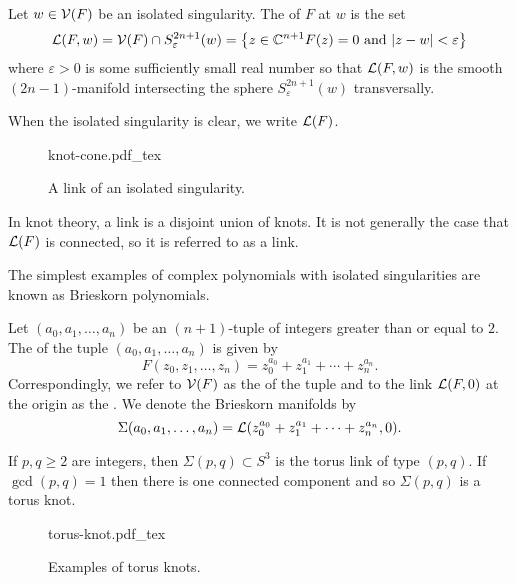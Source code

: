 \begin{definition}
	Let $w\in \mathcal{V}(F)$ be an isolated singularity. The  of $F$ at $w$ is the set 
	\[
		\mathcal{L}(F, w) = \mathcal{V}(F) \cap S^{2n+1}_\varepsilon(w) = \left\{ z\in \mathbb{C}^{n+1}  F(z)=0\textrm{ and } |z-w|<\varepsilon\right\}
	\]
	where $\varepsilon > 0$ is some sufficiently small real number so that $\mathcal{L}(F,w)$ is the smooth $(2n-1)$-manifold intersecting the sphere $S^{2n+1}_\varepsilon(w)$ transversally.
\end{definition}

When the isolated singularity is clear, we write $\mathcal{L}(F)$.

\begin{figure}[ht]
  {knot-cone.pdf_tex}
  \caption{A link of an isolated singularity.}\label{fig:cone-over-knot}
\end{figure}

\begin{remark}
	In knot theory, a link is a disjoint union of knots. It is not generally the case that $\mathcal{L}(F)$ is connected, so it is referred to as a link.
\end{remark}

The simplest examples of complex polynomials with isolated singularities are known as Brieskorn polynomials.

\begin{definition}
	Let $(a_0,a_1,\ldots, a_n)$ be an $(n+1)$-tuple of integers greater than or equal to $2$. The  of the tuple $(a_0,a_1,\ldots, a_n)$ is given by
	\[
		F(z_0,z_1,\ldots, z_n) = z_0^{a_0} + z_1^{a_1} +\cdots + z_n^{a_n}.
	\]
	Correspondingly, we refer to $\mathcal{V}(F)$ as the  of the tuple and to the link $\mathcal{L}(F,0)$ at the origin as the . We denote the Brieskorn manifolds by
	\[
		\Sigma(a_0,a_1,\ldots, a_n) =\mathcal{L}(z_0^{a_0}+z_1^{a_1}+\cdots+z_n^{a_n}, 0).
	\]
\end{definition}

\begin{proposition}
	If $p,q\geq 2$ are integers, then $\Sigma(p,q)\subset S^3$ is the torus link of type $(p,q)$. If $\gcd(p,q)=1$ then there is one connected component and so $\Sigma(p,q)$ is a torus knot.
\end{proposition}
\begin{figure}[ht]
	\centering
  {torus-knot.pdf_tex}
  \caption{Examples of torus knots.}\label{fig:torus-knots}
\end{figure}

